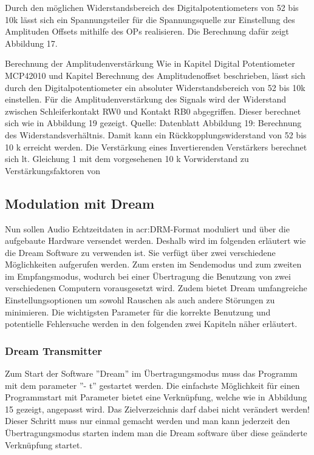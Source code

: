 Durch den möglichen Widerstandsbereich des Digitalpotentiometers von 52 bis 10k lässt sich ein Spannungsteiler für die Spannungsquelle zur Einstellung des Amplituden Offsets mithilfe des OPs realisieren. Die Berechnung dafür zeigt Abbildung 17.

Berechnung der Amplitudenverstärkung
Wie in Kapitel Digital Potentiometer MCP42010 und Kapitel Berechnung des Amplitudenoffset beschrieben, lässt sich durch den Digitalpotentiometer ein absoluter Widerstandsbereich von 52 bis 10k einstellen. Für die Amplitudenverstärkung des Signals wird der Widerstand zwischen Schleiferkontakt RW0 und Kontakt RB0 abgegriffen. Dieser berechnet sich wie in Abbildung 19 gezeigt. Quelle: Datenblatt Abbildung 19: Berechnung des Widerstandsverhältnis. Damit kann ein Rückkopplungswiderstand von 52 bis 10 k erreicht werden. Die Verstärkung eines Invertierenden Verstärkers berechnet sich lt. Gleichung 1 mit dem vorgesehenen 10 k Vorwiderstand zu Verstärkungsfaktoren von

\subsection{Modulation mit Dream}
\label{subsec:dream}
Nun sollen Audio Echtzeitdaten in \gls{acr:DRM}-Format moduliert und über die aufgebaute Hardware versendet werden. Deshalb wird im folgenden erläutert wie die Dream Software zu verwenden ist. Sie verfügt über zwei verschiedene Möglichkeiten aufgerufen werden. Zum ersten im Sendemodus und zum zweiten im Empfangsmodus, wodurch bei einer Übertragung die Benutzung von zwei verschiedenen Computern vorausgesetzt wird. Zudem bietet Dream umfangreiche Einstellungsoptionen um sowohl Rauschen als auch andere Störungen zu minimieren. Die wichtigsten Parameter für die korrekte Benutzung und potentielle Fehlersuche werden in den folgenden zwei Kapiteln näher erläutert.


\subsubsection{Dream Transmitter}
\label{subsubsec:dreamtx}
Zum Start der Software ”Dream” im Übertragungsmodus muss das Programm mit dem parameter ”- t” gestartet werden. Die einfachste Möglichkeit für einen Programmstart mit Parameter bietet eine Verknüpfung, welche wie in Abbildung 15 gezeigt, angepasst wird. Das Zielverzeichnis darf dabei nicht verändert werden! Dieser Schritt muss nur einmal gemacht werden und man kann jederzeit den Übertragungsmodus starten indem man die Dream software über diese geänderte Verknüpfung startet.

